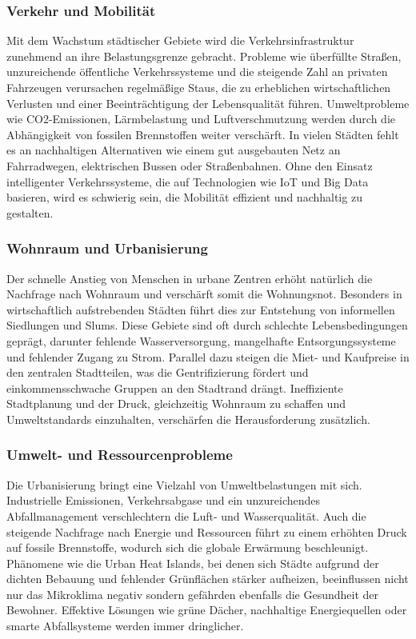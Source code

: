 \documentclass[conference,compsoc,final,a4paper, onecolumn, 11pt]{IEEEtran}
\begin{document}
\subsubsection{Verkehr und Mobilität}
Mit dem Wachstum städtischer Gebiete wird die Verkehrsinfrastruktur zunehmend an ihre Belastungsgrenze gebracht. 
Probleme wie überfüllte Straßen, unzureichende öffentliche Verkehrssysteme und die steigende Zahl an privaten Fahrzeugen verursachen regelmäßige Staus, die zu erheblichen wirtschaftlichen Verlusten und einer Beeinträchtigung der Lebensqualität führen.
Umweltprobleme wie CO2-Emissionen, Lärmbelastung und Luftverschmutzung werden durch die Abhängigkeit von fossilen Brennstoffen weiter verschärft.
In vielen Städten fehlt es an nachhaltigen Alternativen wie einem gut ausgebauten Netz an Fahrradwegen, elektrischen Bussen oder Straßenbahnen. 
Ohne den Einsatz intelligenter Verkehrssysteme, die auf Technologien wie \ac{IoT} und Big Data basieren, wird es schwierig sein, die Mobilität effizient und nachhaltig zu gestalten.\autocite{mckinsey_smart_cities}


\subsubsection{Wohnraum und Urbanisierung}
Der schnelle Anstieg von Menschen in urbane Zentren erhöht natürlich die Nachfrage nach Wohnraum und verschärft somit die Wohnungsnot. 
Besonders in wirtschaftlich aufstrebenden Städten führt dies zur Entstehung von informellen Siedlungen und Slums.
Diese Gebiete sind oft durch schlechte Lebensbedingungen geprägt, darunter fehlende Wasserversorgung, mangelhafte Entsorgungssysteme und fehlender Zugang zu Strom.
Parallel dazu steigen die Miet- und Kaufpreise in den zentralen Stadtteilen, was die Gentrifizierung fördert und einkommensschwache Gruppen an den Stadtrand drängt.
Ineffiziente Stadtplanung und der Druck, gleichzeitig Wohnraum zu schaffen und Umweltstandards einzuhalten, verschärfen die Herausforderung zusätzlich.\autocite{un_habitat_world_cities}


\subsubsection{Umwelt- und Ressourcenprobleme}
Die Urbanisierung bringt eine Vielzahl von Umweltbelastungen mit sich. 
Industrielle Emissionen, Verkehrsabgase und ein unzureichendes Abfallmanagement verschlechtern die Luft- und Wasserqualität. 
Auch die steigende Nachfrage nach Energie und Ressourcen führt zu einem erhöhten Druck auf fossile Brennstoffe, wodurch sich die globale Erwärmung beschleunigt.
Phänomene wie die Urban Heat Islands, bei denen sich Städte aufgrund der dichten Bebauung und fehlender Grünflächen stärker aufheizen, beeinflussen nicht nur  das Mikroklima negativ sondern gefährden  ebenfalls die Gesundheit der Bewohner.
Effektive Lösungen wie grüne Dächer, nachhaltige Energiequellen oder smarte Abfallsysteme werden immer dringlicher. \autocite{mdpi_smart_cities_iot}
\end{document}
